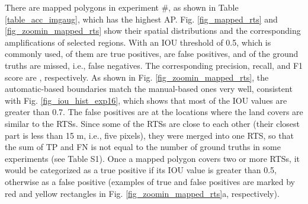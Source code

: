 \documentclass[authoryear,preprint,review,12pt]{elsarticle}
\begin{document}
There are  mapped polygons in experiment \#, as shown in Table \ref{table_acc_imgaug}, which has the highest AP.  Fig. \ref{fig_mapped_rts} and \ref{fig_zoomin_mapped_rts} show their spatial distributions and the corresponding ampliﬁcations of selected regions. With an IOU threshold of 0.5, which is commonly used,  of them are true positives,  are false positives, and  of the ground truths are missed, i.e., false negatives. The corresponding precision, recall, and F1 score are , respectively. As shown in Fig. \ref{fig_zoomin_mapped_rts}, the automatic-based boundaries match the manual-based ones very well, consistent with Fig. \ref{fig_iou_hist_exp16}, which shows that most of the IOU values are greater than 0.7. The false positives are at the locations where the land covers are similar to the RTSs. Since some of the RTSs are close to each other (their closest part is less than 15 m, i.e., five pixels), they were merged into one RTS,
so that the sum of TP and FN is not equal to the number of ground truths in some experiments (see Table S1). Once a mapped polygon covers two or more RTSs, it would be categorized as a true positive if its IOU value is greater than 0.5, otherwise as a false positive (examples of true and false positives are marked by red and yellow rectangles in Fig. \ref{fig_zoomin_mapped_rts}a, respectively). 

\end{document}
